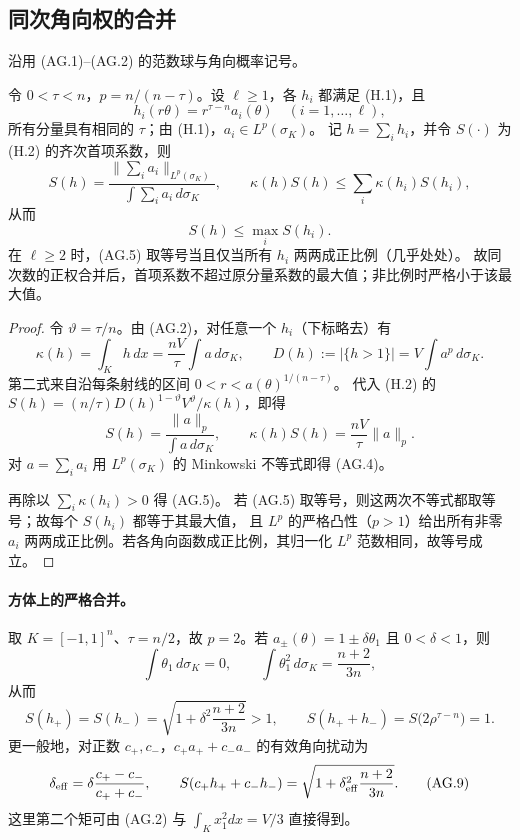 \subsection{同次角向权的合并}\label{subsec:angular-grouping}

沿用 (AG.1)--(AG.2) 的范数球与角向概率记号。

\begin{proposition}[同次合并不增加角向首项]\label{prop:angular-grouping}
令 $0<\tau<n$，$p=n/(n-\tau)$。设 $\ell\ge1$，各 $h_i$ 都满足 \textup{(H.1)}，且
\[
 h_i(r\theta)=r^{\tau-n}a_i(\theta)\quad(i=1,\ldots,\ell),\tag{AG.3}
\]
所有分量具有相同的 $\tau$；由 (H.1)，$a_i\in L^p(\sigma_K)$。
记 $h=\sum_i h_i$，并令 $S(\cdot)$ 为 \textup{(H.2)} 的齐次首项系数，则
\[
 S(h)=\frac{\|\sum_i a_i\|_{L^p(\sigma_K)}}
 {\int\sum_i a_i\,d\sigma_K},\qquad
 \kappa(h)S(h)\le\sum_i\kappa(h_i)S(h_i),\tag{AG.4}
\]
从而
\[
 S(h)\le\max_iS(h_i).\tag{AG.5}
\]
在 $\ell\ge2$ 时，\textup{(AG.5)} 取等号当且仅当所有 $h_i$ 两两成正比例（几乎处处）。
故同次数的正权合并后，首项系数不超过原分量系数的最大值；非比例时严格小于该最大值。
\end{proposition}
\begin{proof}
令 $\vartheta=\tau/n$。由 \textup{(AG.2)}，对任意一个 $h_i$（下标略去）有
\[
 \kappa(h)=\int_Kh\,dx=\frac{nV}{\tau}\int a\,d\sigma_K,
 \qquad
 D(h):=|\{h>1\}|=V\int a^p\,d\sigma_K.\tag{AG.6}
\]
第二式来自沿每条射线的区间 $0<r<a(\theta)^{1/(n-\tau)}$。
代入 \textup{(H.2)} 的
$S(h)=(n/\tau)D(h)^{1-\vartheta}V^\vartheta/\kappa(h)$，即得
\[
 S(h)=\frac{\|a\|_p}{\int a\,d\sigma_K},\qquad
 \kappa(h)S(h)=\frac{nV}{\tau}\|a\|_p.\tag{AG.7}
\]
对 $a=\sum_i a_i$ 用 $L^p(\sigma_K)$ 的 Minkowski 不等式即得
\textup{(AG.4)}。

再除以 $\sum_i\kappa(h_i)>0$ 得 \textup{(AG.5)}。
若 \textup{(AG.5)} 取等号，则这两次不等式都取等号；故每个 $S(h_i)$ 都等于其最大值，
且 $L^p$ 的严格凸性（$p>1$）给出所有非零 $a_i$ 两两成正比例。若各角向函数成正比例，其归一化 $L^p$ 范数相同，故等号成立。
\end{proof}

\paragraph{方体上的严格合并。}
取 $K=[-1,1]^n$、$\tau=n/2$，故 $p=2$。若
\(a_\pm(\theta)=1\pm\delta\theta_1\) 且 $0<\delta<1$，则
\[
 \int\theta_1\,d\sigma_K=0,\qquad
 \int\theta_1^2\,d\sigma_K=\frac{n+2}{3n},
\]
从而
\[
 S(h_+)=S(h_-)=\sqrt{1+\delta^2\frac{n+2}{3n}}>1,
 \qquad S(h_++h_-)=S\bigl(2\rho^{\tau-n}\bigr)=1.\tag{AG.8}
\]
更一般地，对正数 $c_+,c_-$，$c_+a_++c_-a_-$ 的有效角向扰动为
\[
 \delta_{\rm eff}=\delta\frac{c_+-c_-}{c_++c_-},
 \qquad
 S(c_+h_++c_-h_-)=
 \sqrt{1+\delta_{\rm eff}^2\frac{n+2}{3n}}.\tag{AG.9}
\]
这里第二个矩可由 \textup{(AG.2)} 与
\(\int_Kx_1^2dx=V/3\) 直接得到。
